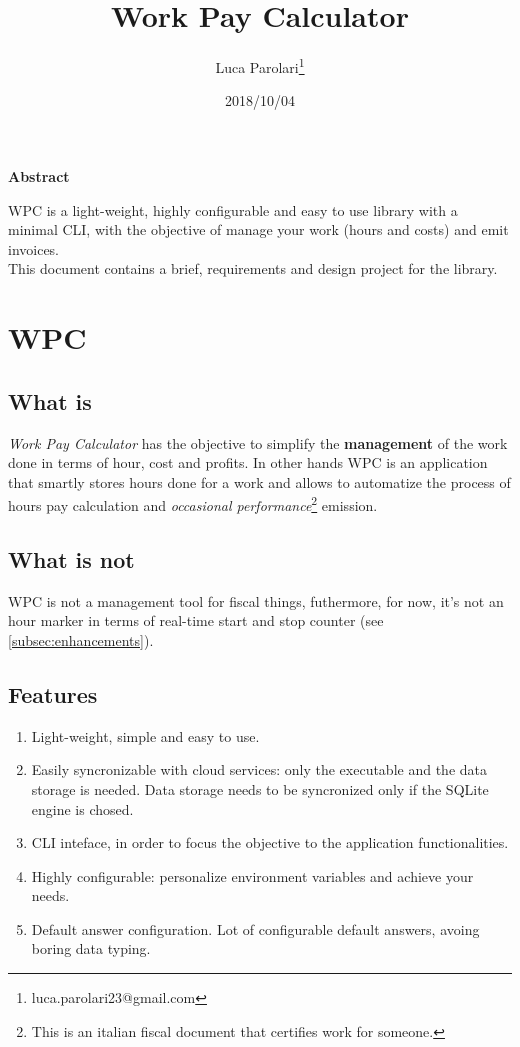 \documentclass[11pt]{article}
\title{\textbf{Work Pay Calculator}}
\date{2018/10/04}
\author{Luca Parolari\footnote{luca.parolari23@gmail.com}}
\newenvironment{dedication}
  {%
   \vspace*{\stretch{1}}%
   \itshape             %
   \center
  }
  {\par %
   \vspace{\stretch{3}} %
   \clearpage           %
  }
\begin{document}
\maketitle

\begin{dedication}
\textbf{Abstract}
\begin{changemargin}{2cm}{2cm}
WPC is a light-weight, highly configurable and easy to use library with a minimal CLI, with the objective of manage your work (hours and costs) and emit invoices.\\
This document contains a brief, requirements and design project for the library.\\
\end{changemargin}
\end{dedication}

\tableofcontents
\clearpage

\section{WPC}

\subsection{What is}
\textit{Work Pay Calculator} has the objective to simplify the \textbf{management} of the work done in terms of hour, cost and profits. In other hands WPC is an application that smartly stores hours done for a work and allows to automatize the process of hours pay calculation and \textit{occasional performance}\footnote{This is an italian fiscal document that certifies work for someone.} emission.

\subsection{What is not}
WPC is not a management tool for fiscal things, futhermore, for now, it's not an hour marker in terms of real-time start and stop counter (see \ref{subsec:enhancements}).

\subsection{Features}
\begin{enumerate}[label=(\alph*)]
\item Light-weight, simple and easy to use.
\item Easily syncronizable with cloud services: only the executable and the data storage is needed. Data storage needs to be syncronized only if the SQLite engine is chosed.
\item CLI inteface, in order to focus the objective to the application functionalities.
\item Highly configurable: personalize environment variables and achieve your needs.
\item Default answer configuration. Lot of configurable default answers, avoing boring data typing.
\end{enumerate}
\end{document}

